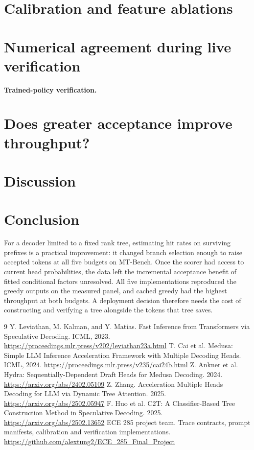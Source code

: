 \documentclass{article}
\begin{document}
\section{Calibration and feature ablations}

\clearpage
\section{Numerical agreement during live verification}

\paragraph{Trained-policy verification.} 

\clearpage
\section{Does greater acceptance improve throughput?}

\clearpage
\section{Discussion}

\section{Conclusion}
For a decoder limited to a fixed rank tree, estimating hit rates on surviving prefixes is a practical improvement: it changed branch selection enough to raise accepted tokens at all five budgets on MT-Bench. Once the scorer had access to current head probabilities, the data left the incremental acceptance benefit of fitted conditional factors unresolved. All five implementations reproduced the greedy outputs on the measured panel, and cached greedy had the highest throughput at both budgets. A deployment decision therefore needs the cost of constructing and verifying a tree alongside the tokens that tree saves.
\clearpage
\begin{thebibliography}{9}
 Y. Leviathan, M. Kalman, and Y. Matias. Fast Inference from Transformers via Speculative Decoding. ICML, 2023. \url{https://proceedings.mlr.press/v202/leviathan23a.html}
 T. Cai et al. Medusa: Simple LLM Inference Acceleration Framework with Multiple Decoding Heads. ICML, 2024. \url{https://proceedings.mlr.press/v235/cai24b.html}
 Z. Ankner et al. Hydra: Sequentially-Dependent Draft Heads for Medusa Decoding. 2024. \url{https://arxiv.org/abs/2402.05109}
 Z. Zhang. Acceleration Multiple Heads Decoding for LLM via Dynamic Tree Attention. 2025. \url{https://arxiv.org/abs/2502.05947}
 F. Huo et al. C2T: A Classifier-Based Tree Construction Method in Speculative Decoding. 2025. \url{https://arxiv.org/abs/2502.13652}
 ECE 285 project team. Trace contracts, prompt manifests, calibration and verification implementations. \url{https://github.com/alextung2/ECE_285_Final_Project}
\end{thebibliography}
\end{document}
